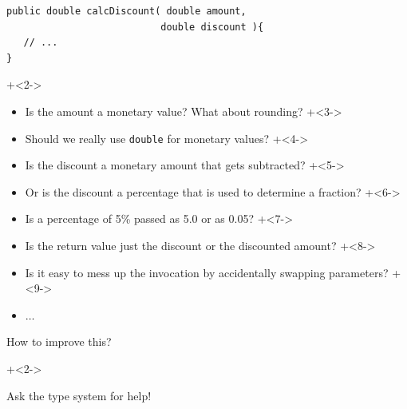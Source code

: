 \begin{frame}[fragile]{}

\begin{lstlisting}
public double calcDiscount( double amount, 
                           double discount ){
   // ...
}
\end{lstlisting}

\onslide+<2->

\begin{itemize}
\item Is the amount a monetary value? What about rounding?
\onslide+<3->
\item Should we really use \texttt{double} for monetary values?
\onslide+<4->
\item Is the discount a monetary amount that gets subtracted?
\onslide+<5->
\item Or is the discount a percentage that is used to determine a fraction?
\onslide+<6->
\item Is a percentage of 5\% passed as 5.0 or as 0.05?
\onslide+<7->
\item Is the return value just the discount or the discounted amount?
\onslide+<8->
\item Is it easy to mess up the invocation by accidentally swapping parameters?
\onslide+<9->
\item $\ldots$
\end{itemize}

\end{frame}


\begin{frame}[fragile]{How to improve this?}

\onslide+<2->

{
\huge
Ask the type system for help!
}


\end{frame}

